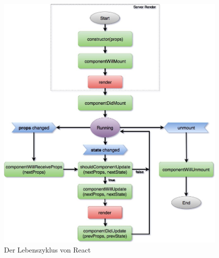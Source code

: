 \begin{figure}[ht]
	\centering
	\includegraphics[height=0.60\textheight, keepaspectratio]{img/client/Lifecycle.jpeg}
	\captionsetup{justification=centering, format=plain}
	\caption[Der Lebenszyklus von React]{Der Lebenszyklus von React \\ \quelle \cite{reactLifeCycle}}
	\label{fig:ReactLifecylce}
\end{figure}
